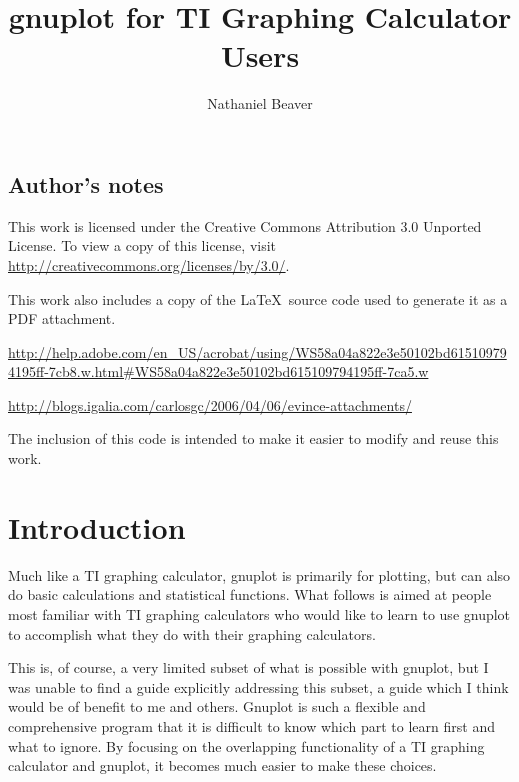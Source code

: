 \documentclass[11pt,letterpaper]{report}
\author{Nathaniel Beaver}
\title{gnuplot for TI Graphing Calculator Users}
\begin{document}
\maketitle

\lstset{
language=gnuplot,                       %
basicstyle=\ttfamily,                   %
}



\tableofcontents

\section{Author's notes}

This work is licensed under the Creative Commons Attribution 3.0 Unported License. To view a copy of this license, visit \url{http://creativecommons.org/licenses/by/3.0/}.

This work also includes a copy of the \LaTeX\ source code used to generate it as a PDF attachment.

\url{http://help.adobe.com/en_US/acrobat/using/WS58a04a822e3e50102bd615109794195ff-7cb8.w.html#WS58a04a822e3e50102bd615109794195ff-7ca5.w}

\url{http://blogs.igalia.com/carlosgc/2006/04/06/evince-attachments/}

The inclusion of this code is intended to make it easier to modify and reuse this work.

\chapter{Introduction}

Much like a TI graphing calculator, gnuplot is primarily for plotting, but can also do basic calculations and statistical functions. What follows is aimed at people most familiar with TI graphing calculators who would like to learn to use gnuplot to accomplish what they do with their graphing calculators.

This is, of course, a very limited subset of what is possible with gnuplot, but I was unable to find a guide explicitly addressing this subset, a guide which I think would be of benefit to me and others. Gnuplot is such a flexible and comprehensive program that it is difficult to know which part to learn first and what to ignore. By focusing on the overlapping functionality of a TI graphing calculator and gnuplot, it becomes much easier to make these choices.
\end{document}
